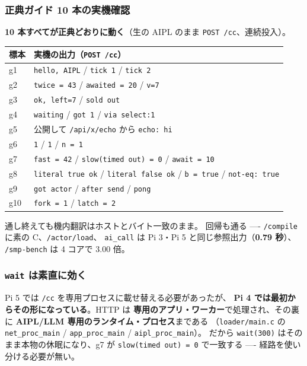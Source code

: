 \documentclass[11pt,a4paper]{ltjsarticle}
\begin{document}
\subsubsection*{正典ガイド 10 本の実機確認}

\textbf{10 本すべてが正典どおりに動く}（生の AIPL のまま \texttt{POST /cc}、連続投入）。

\begin{center}
\small
\begin{tabular}{@{}ll@{}}
\toprule
標本 & 実機の出力（\texttt{POST /cc}） \\
\midrule
g1  & \texttt{hello, AIPL} / \texttt{tick 1} / \texttt{tick 2} \\
g2  & \texttt{twice = 43} / \texttt{awaited = 20} / \texttt{v=7} \\
g3  & \texttt{ok, left=7} / \texttt{sold out} \\
g4  & \texttt{waiting} / \texttt{got 1} / \texttt{via select:1} \\
g5  & 公開して \texttt{/api/x/echo} から \texttt{echo: hi} \\
g6  & \texttt{1} / \texttt{1} / \texttt{n = 1} \\
g7  & \texttt{fast = 42} / \texttt{slow(timed out) = 0} / \texttt{await = 10} \\
g8  & \texttt{literal true ok} / \texttt{literal false ok} / \texttt{b = true} / \texttt{not-eq: true} \\
g9  & \texttt{got actor} / \texttt{after send} / \texttt{pong} \\
g10 & \texttt{fork = 1} / \texttt{latch = 2} \\
\bottomrule
\end{tabular}
\end{center}

通し終えても機内翻訳はホストとバイト一致のまま。
回帰も通る ---- \texttt{/compile} に素の C、\texttt{/actor/load}、
\texttt{ai\_call} は Pi 3・Pi 5 と同じ参照出力（\textbf{0.79 秒}）、
\texttt{/smp-bench} は 4 コアで 3.00 倍。

\subsubsection*{\texttt{wait} は素直に効く}

Pi 5 では \texttt{/cc} を専用プロセスに載せ替える必要があったが、
\textbf{Pi 4 では最初からその形になっている}。HTTP は
\textbf{専用のアプリ・ワーカー}で処理され、その裏に
\textbf{AIPL/LLM 専用のランタイム・プロセス}まである
（\texttt{loader/main.c} の \texttt{net\_proc\_main} / \texttt{app\_proc\_main} /
\texttt{aipl\_proc\_main}）。
だから \texttt{wait(300)} はそのまま本物の休眠になり、g7 が
\texttt{slow(timed out) = 0} で一致する ---- 経路を使い分ける必要が無い。
\end{document}
